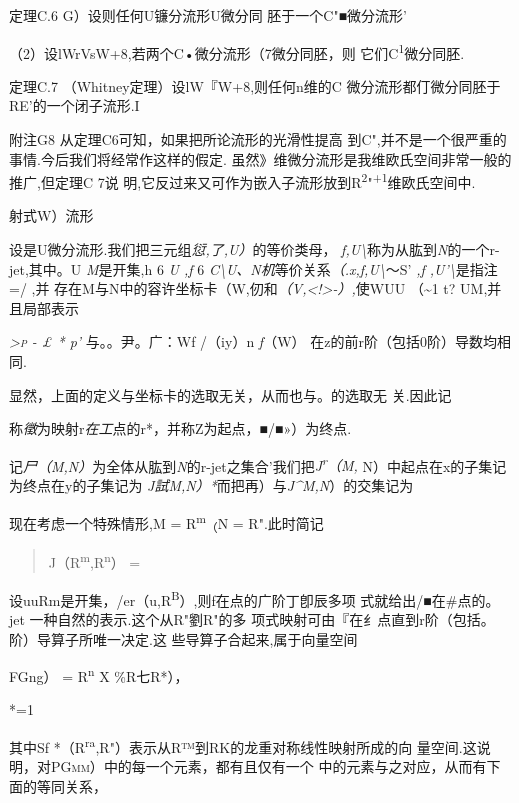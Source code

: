 \documentclass{article}
\begin{document}
定理C.6 G）设则任何U镰分流形U微分同 胚于一个C"■微分流形'

（2）设lWrVsW+8,若两个C•微分流形（7微分同胚，则
它们C\textsuperscript{1}微分同胚.\textbar{}

定理C.7 （Whitney定理）设lW『W+8,则任何n维的C
微分流形都仃微分同胚于RE'的一个闭子流形.I

附注G8 从定理C6可知，如果把所论流形的光滑性提高
到C",并不是一个很严重的事情.今后我们将经常作这样的假定.
虽然》维微分流形是我维欧氏空间非常一般的推广,但定理C 7说
明,它反过来又可作为嵌入子流形放到R\textsuperscript{2}"\textsuperscript{+1}维欧氏空间中.

射式W）流形

设是U微分流形.我们把三元组\emph{愆,了,U）}的等价类母，
\emph{f,U\textbackslash{}}称为从肱到\emph{N}的一个r-jet,其中。U
\emph{M}是开集,h 6 \emph{U ,f} 6
\emph{C\textbackslash{}U、N机}等价关系\emph{（.x,f,U\textbackslash{}}〜S'
\emph{,f ,U'\textbackslash{}}是指注=/ ,并
存在M与N中的容许坐标卡（W,仞和\emph{（V,\textless{}!\textgreater{}-）,}使WUU
（\textasciitilde{}1 t? UM,并且局部表示

\emph{\textsc{\textgreater{}p} - £ * p'} 与。。尹。广：Wf /（iy）n
\emph{f}（W） 在z的前r阶（包括0阶）导数均相同.

显然，上面的定义与坐标卡的选取无关，从而也与。的选取无 关.因此记

称\emph{徵}为映射r\emph{在工}点的r*，并称Z为起点，■/■»）为终点.

记\emph{尸（M,N）}为全体从肱到\emph{N}的r-jet之集合'我们把\emph{J\textsuperscript{r}（M,}
N）中起点在x的子集记为终点在y的子集记为
\emph{J試M,N）*}而把再）与\emph{J\^{}M,N}）的交集记为

现在考虑一个特殊情形,M = R\textsuperscript{m}\textsubscript{（}N =
R".此时简记

\begin{quote}
J（R\textsuperscript{m},R\textsuperscript{n}） =
\end{quote}

设uuRm是开集，/er（u,R\textsuperscript{B}）,则f在点的广阶丁卽辰多项
式就给出/■在\#点的。jet 一种自然的表示.这个从R"劉R"的多
项式映射可由『在纟点直到r阶（包括。阶）导算子所唯一决定.这
些导算子合起来,属于向量空间

FGng） = R\textsuperscript{n} X \%R七R*），

*=1

其中Sf
*（R\textsuperscript{ra},R"）表示从R™到RK的龙重对称线性映射所成的向
量空间.这说明，对\textsc{PGmm）}中的每一个元素，都有且仅有一个
中的元素与之对应，从而有下面的等同关系，
\end{document}
